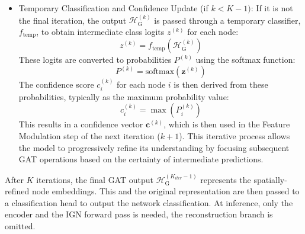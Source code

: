 \begin{itemize}
  \item Temporary Classification and Confidence Update (if \(k < K-1)\):
    If it is not the final iteration, the output \(\mathcal{H}_{\text{G}}^{(k)}\) is passed through a temporary classifier, \(f_{\text{temp}}\), to obtain intermediate class logits \(z^{(k)}\) for each node:
    \begin{equation}
      z^{(k)} = f_{\text{temp}}(\mathcal{H}_{\text{G}}^{(k)})
    \end{equation}
    These logits are converted to probabilities \(P^{(k)}\) using the softmax function:
    \begin{equation}
      P^{(k)} = \text{softmax}(\mathbf{z}^{(k)})
    \end{equation}
    The confidence score \(c_i^{(k)}\) for each node \(i\) is then derived from these probabilities, typically as the maximum probability value:
    \begin{equation}
      c_i^{(k)} = \max(P_i^{(k)})
    \end{equation}
    This results in a confidence vector \(\mathbf{c}^{(k)}\), which is then used in the Feature Modulation step of the next iteration (\(k+1\)). This iterative process allows the model to progressively refine its understanding by focusing subsequent GAT operations based on the certainty of intermediate predictions.
\end{itemize}

After \(K\) iterations, the final GAT output \(\mathcal{H}_{\text{G}}^{(K_{iter}-1)}\) represents the spatially-refined node embeddings. This and the original representation are then passed to a classification head to output the network classification. At inference, only the encoder and the IGN forward pass is needed, the reconstruction branch is omitted.
